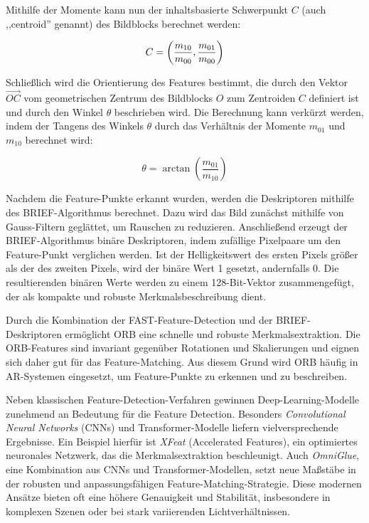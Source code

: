 Mithilfe der Momente kann nun der inhaltsbasierte Schwerpunkt \( C \) (auch ,,centroid'' genannt) des Bildblocks berechnet werden:

\begin{equation}
C = 
\left(
\frac{m_{10}}{m_{00}}, \\
\frac{m_{01}}{m_{00}}
\right)
\end{equation}

Schließlich wird die Orientierung des Features bestimmt, die durch den Vektor \( \overrightarrow{OC} \) vom geometrischen Zentrum des Bildblocks \( O \) zum Zentroiden \( C \) definiert ist und durch den Winkel \( \theta \) beschrieben wird. Die Berechnung kann verkürzt werden, indem der Tangens des Winkels \( \theta \) durch das Verhältnis der Momente \( m_{01} \) und \( m_{10} \) berechnet wird:

\begin{equation}
    \theta = \arctan \left( \frac{m_{01}}{m_{10}} \right)
\end{equation}

Nachdem die Feature-Punkte erkannt wurden, werden die Deskriptoren mithilfe des BRIEF-Algorithmus berechnet. Dazu wird das Bild zunächst mithilfe von Gauss-Filtern geglättet, um Rauschen zu reduzieren. Anschließend erzeugt der BRIEF-Algorithmus binäre Deskriptoren, indem zufällige Pixelpaare um den Feature-Punkt verglichen werden. Ist der Helligkeitswert des ersten Pixels größer als der des zweiten Pixels, wird der binäre Wert 1 gesetzt, andernfalls 0. Die resultierenden binären Werte werden zu einem 128-Bit-Vektor zusammengefügt, der als kompakte und robuste Merkmalsbeschreibung dient. \cite{gao2021vSLAM, calonder2010brief}

Durch die Kombination der FAST-Feature-Detection und der BRIEF-Deskriptoren ermöglicht ORB eine schnelle und robuste Merkmalsextraktion. Die ORB-Features sind invariant gegenüber Rotationen und Skalierungen und eignen sich daher gut für das Feature-Matching. Aus diesem Grund wird ORB häufig in AR-Systemen eingesetzt, um Feature-Punkte zu erkennen und zu beschreiben. \cite{gao2021vSLAM, rublee2011orb}

Neben klassischen Feature-Detection-Verfahren gewinnen Deep-Learning-Modelle zunehmend an Bedeutung für die Feature Detection. Besonders \emph{Convolutional Neural Networks} (CNNs) und Transformer-Modelle liefern vielversprechende Ergebnisse. Ein Beispiel hierfür ist \emph{XFeat} (Accelerated Features), ein optimiertes neuronales Netzwerk, das die Merkmalsextraktion beschleunigt. Auch \emph{OmniGlue}, eine Kombination aus CNNs und Transformer-Modellen, setzt neue Maßstäbe in der robusten und anpassungsfähigen Feature-Matching-Strategie. Diese modernen Ansätze bieten oft eine höhere Genauigkeit und Stabilität, insbesondere in komplexen Szenen oder bei stark variierenden Lichtverhältnissen. \cite{ghosh2024fmNN}


